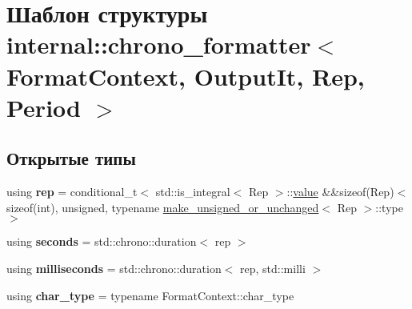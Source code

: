 \hypertarget{structinternal_1_1chrono__formatter}{}\section{Шаблон структуры internal\+:\+:chrono\+\_\+formatter$<$ Format\+Context, Output\+It, Rep, Period $>$}
\label{structinternal_1_1chrono__formatter}
\subsection*{Открытые типы}
\begin{DoxyCompactItemize}
\item 
\mbox{\label{structinternal_1_1chrono__formatter_a0d2cf0ef93d14d1ce3a44b9ef48cf218}} 
using {\bfseries rep} = conditional\+\_\+t$<$ std\+::is\+\_\+integral$<$ Rep $>$\+::\hyperlink{classinternal_1_1value}{value} \&\&sizeof(Rep)$<$ sizeof(int), unsigned, typename \hyperlink{structinternal_1_1make__unsigned__or__unchanged}{make\+\_\+unsigned\+\_\+or\+\_\+unchanged}$<$ Rep $>$\+::type $>$
\item 
\mbox{\label{structinternal_1_1chrono__formatter_ad45e80d4cf0805176cc980f93f99e95e}} 
using {\bfseries seconds} = std\+::chrono\+::duration$<$ rep $>$
\item 
\mbox{\label{structinternal_1_1chrono__formatter_a9435a37e3cd01a35f2e84d5b8a0ac95e}} 
using {\bfseries milliseconds} = std\+::chrono\+::duration$<$ rep, std\+::milli $>$
\item 
\mbox{\label{structinternal_1_1chrono__formatter_a00dde15800a2da0d4740c04757420f78}} 
using {\bfseries char\+\_\+type} = typename Format\+Context\+::char\+\_\+type
\end{DoxyCompactItemize}
